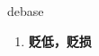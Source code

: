 
\begin{frame}
{\huge debase}
\begin{center}
\begin{enumerate}\Large
  \item \textbf{贬低，贬损}
\end{enumerate}
\end{center}
\end{frame}
